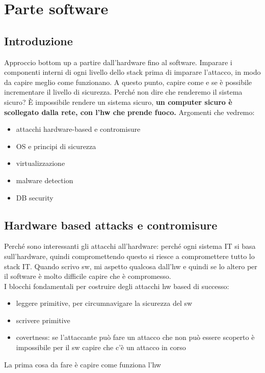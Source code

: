 \documentclass[12pt, oneside]{extbook} %
\begin{document}
\newpage
\part{Parte software}
\chapter{Introduzione}
Approccio bottom up a partire dall'hardware fino al software. Imparare i componenti interni di ogni livello dello stack prima di imparare l'attacco, in modo da capire meglio come funzionano. A questo punto, capire come e se è possibile incrementare il livello di sicurezza. Perché non dire che renderemo il sistema sicuro? È impossibile rendere un sistema sicuro, \textbf{un computer sicuro è scollegato dalla rete, con l'hw che prende fuoco.}
Argomenti che vedremo:
\begin{itemize}
\item attacchi hardware-based e contromisure
\item OS e principi di sicurezza
\item virtualizzazione
\item malware detection
\item DB security
\end{itemize}
\chapter{Hardware based attacks e contromisure}
Perché sono interessanti gli attacchi all'hardware: perché ogni sistema IT si basa sull'hardware, quindi compromettendo questo si riesce a compromettere tutto lo stack IT. Quando scrivo sw, mi aspetto qualcosa dall'hw e quindi se lo altero per il software è molto difficile capire che è compromesso.\\ I blocchi fondamentali per costruire degli attacchi hw based di successo:
\begin{itemize}
\item leggere primitive, per circumnavigare la sicurezza del sw
\item scrivere primitive
\item covertness: se l'attaccante può fare un attacco che non può essere scoperto è impossibile per il sw capire che c'è un attacco in corso
\end{itemize}
La prima cosa da fare è capire come funziona l'hw
\end{document}
